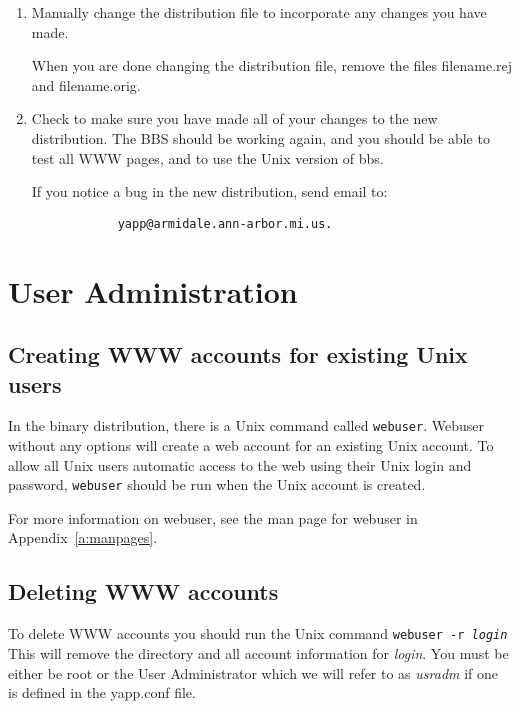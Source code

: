 \documentclass[twoside]{report}
\begin{document}
\begin{enumerate}
      \item  Manually change the distribution file to incorporate any changes 
         you have made.
   
         When you are done changing the distribution file, remove the 
         files filename.rej and filename.orig. 
          
      \item Check to make sure you have made all of your changes to the new
         distribution.  The BBS should be working again, and you should
         be able to test all WWW pages, and to use the Unix version of bbs.
   
         If you notice a bug in the new distribution, send email to:
            \begin{verbatim} 
            yapp@armidale.ann-arbor.mi.us.
            \end{verbatim}
      \end{enumerate}

\chapter{User Administration} \label{c:user}
   \section{Creating WWW accounts for existing Unix users} \label{s:webuser}
       In the binary distribution, there is a Unix command 
       called {\tt webuser}.  Webuser without any options will 
       create a web account for an existing Unix account.  To allow all 
       Unix users automatic access to the web using their Unix login and 
       password, {\tt webuser} should be run when the Unix account is created.
   
    
       For more information on webuser, see the man page for webuser in 
       Appendix~\ref{a:manpages}.

   \section{Deleting WWW accounts}
      To delete WWW accounts you should run the Unix command 
      {\tt webuser -r {\em login} }  This will remove the 
      directory and all account information for {\em login}.  You must be
      either be root or the User Administrator 
      which we will refer to as {\em usradm} if one is 
      defined in the yapp.conf file.
\end{document}
